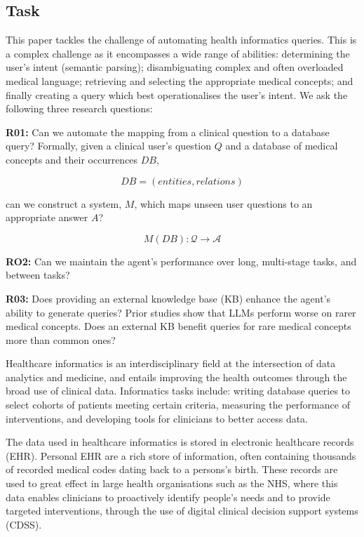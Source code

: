\documentclass[11pt]{article}
\begin{document}
\subsection{Task}
This paper tackles the challenge of automating health informatics queries. This is a complex challenge as it encompasses a wide range of abilities: determining the user's intent (semantic parsing); disambiguating complex and often overloaded medical language; retrieving and selecting the appropriate medical concepts; and finally creating a query which best operationalises the user's intent. We ask the following three research questions:

\textbf{R01:} Can we automate the mapping from a clinical question to a database query? Formally, given a clinical user's question $Q$ and a database of medical concepts and their occurrences $DB$,

  $$ DB = (entities, relations) $$

can we construct a system, $M$, which maps unseen user questions to an appropriate answer $A$?

  $$ M(DB): \mathcal{Q} \rightarrow \mathcal{A} $$

\textbf{RO2:} Can we maintain the agent's performance over long, multi-stage tasks, and between tasks?

\textbf{R03:} Does providing an external knowledge base (KB) enhance the agent's ability to generate queries? Prior studies show that LLMs perform worse on rarer medical concepts. Does an external KB benefit queries for rare medical concepts more than common ones?



Healthcare informatics is an interdisciplinary field at the intersection of data analytics and medicine, and entails improving the health outcomes through the broad use of clinical data. Informatics tasks include: writing database queries to select cohorts of patients meeting certain criteria, measuring the performance of interventions, and developing tools for clinicians to better access data. 

The data used in healthcare informatics is stored in electronic healthcare records (EHR). Personal EHR are a rich store of information, often containing thousands of recorded medical codes dating back to a persons's birth. These records are used to great effect in large health organisations such as the NHS, where this data enables clinicians to proactively identify people's needs and to provide targeted interventions, through the use of digital clinical decision support systems (CDSS).
\end{document}
